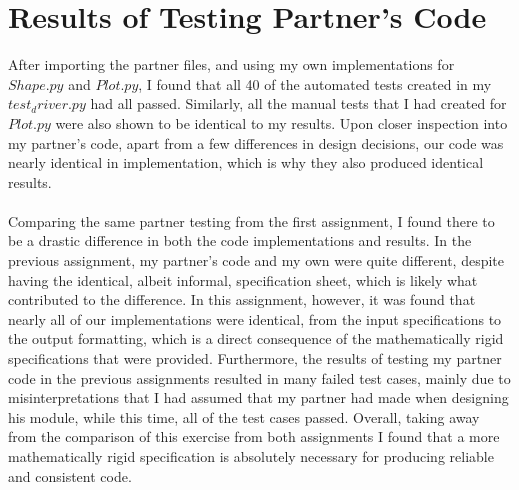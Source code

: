 \documentclass[12pt]{article}
\begin{document}
\section{Results of Testing Partner's Code}
After importing the partner files, and using my own implementations for $Shape.py$ and $Plot.py$, I found that all 40 of the automated tests created in my $test_driver.py$ had all passed. Similarly, all the manual tests that I had created for $Plot.py$ were also shown to be identical to my results. Upon closer inspection into my partner's code, apart from a few differences in design decisions, our code was nearly identical in implementation, which is why they also produced identical results.
\\\\
Comparing the same partner testing from the first assignment, I found there to be a drastic difference in both the code implementations and results. In the previous assignment, my partner's code and my own were quite different, despite having the identical, albeit informal, specification sheet, which is likely what contributed to the difference. In this assignment, however, it was found that nearly all of our implementations were identical, from the input specifications to the output formatting, which is a direct consequence of the mathematically rigid specifications that were provided. Furthermore, the results of testing my partner code in the previous assignments resulted in many failed test cases, mainly due to misinterpretations that I had assumed that my partner had made when designing his module, while this time, all of the test cases passed. Overall, taking away from the comparison of this exercise from both assignments I found that a more mathematically rigid specification is absolutely necessary for producing reliable and consistent code.
\end{document}
